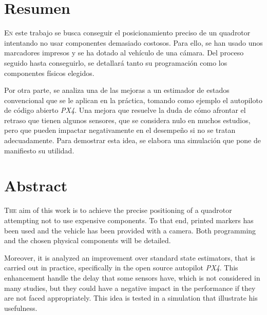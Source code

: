 \chapter*{Resumen}
\pagestyle{especial}
{}


\lettrine[lraise=-0.1, lines=2, loversize=0.2]{E}{n} este trabajo se busca conseguir el posicionamiento preciso de un quadrotor intentando no usar componentes demasiado costosos. Para ello, se han usado unos marcadores impresos y se ha dotado al vehículo de una cámara. Del proceso seguido hasta conseguirlo, se detallará tanto su programación como los componentes físicos elegidos.

Por otra parte, se analiza una de las mejoras a un estimador de estados convencional que se le aplican en la práctica, tomando como ejemplo el autopiloto de código abierto \textit{PX4}. Una mejora que resuelve la duda de cómo afrontar el retraso que tienen algunos sensores, que se considera nulo en muchos estudios, pero que pueden impactar negativamente en el desempeño si no se tratan adecuadamente. Para demostrar esta idea, se elabora una simulación que pone de manifiesto su utilidad. 

 


\chapter*{Abstract}
\pagestyle{especial}
{}

\lettrine[lraise=-0.1, lines=2, loversize=0.2]{T}{he} aim of this work is to achieve the precise positioning of a quadrotor attempting not to use expensive components. To that end, printed markers has been used and the vehicle has been provided with a camera. Both programming and the chosen physical components will be detailed.

Moreover, it is analyzed an improvement over standard state estimators, that is carried out in practice, specifically in the open source autopilot \textit{PX4}. This enhancement handle the delay that some sensors have, which is not considered in many studies, but they could have a negative impact in the performance if they are not faced appropriately. This idea is tested in a simulation that illustrate his usefulness.


